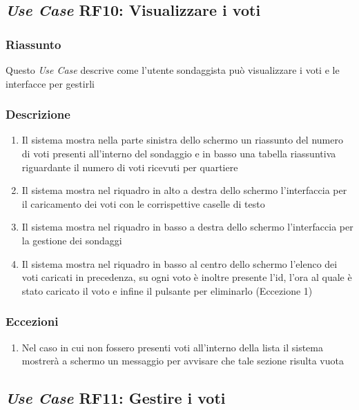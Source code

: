     \subsection{\textit{Use Case} RF10: Visualizzare i voti}
        \subsubsection{Riassunto}
            Questo \textit{Use Case} descrive come l'utente sondaggista può visualizzare i voti e le interfacce per gestirli
        \subsubsection{Descrizione}
            \begin{enumerate}
                \item Il sistema mostra nella parte sinistra dello schermo un riassunto del numero di voti presenti all'interno del sondaggio e in basso una tabella riassuntiva riguardante il numero di voti ricevuti per quartiere
                \item Il sistema mostra nel riquadro in alto a destra dello schermo l'interfaccia per il caricamento dei voti con le corrispettive caselle di testo
                \item Il sistema mostra nel riquadro in basso a destra dello schermo l'interfaccia per la gestione dei sondaggi
                \item Il sistema mostra nel riquadro in basso al centro dello schermo l'elenco dei voti caricati in precedenza, su ogni voto è inoltre presente l'id, l'ora al quale è stato caricato il voto e infine il pulsante per eliminarlo (Eccezione 1)
            \end{enumerate}
        \subsubsection{Eccezioni}
            \begin{enumerate}
                \item Nel caso in cui non fossero presenti voti all'interno della lista il sistema mostrerà a schermo un messaggio per avvisare che tale sezione risulta vuota
            \end{enumerate}

    \subsection{\textit{Use Case} RF11: Gestire i voti}
